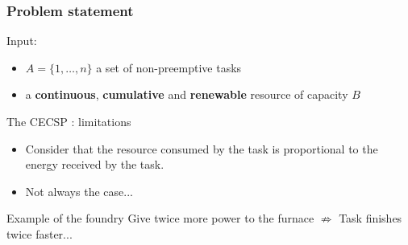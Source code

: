 \begin{frame}
  \frametitle{Problem statement}
  \vfill
  Input:\\
  \begin{itemize}
  \item $A=\{1,\hdots,n\}$ a set of non-preemptive tasks
  \item a {\bf continuous}, {\bf cumulative} and {\bf renewable} resource of capacity  $B$
  \end{itemize}
  \vfill
  \begin{overlayarea}{\linewidth}{1cm}
  \end{overlayarea}
\end{frame}



\begin{frame}{The CECSP : limitations}
  \vfill
  \begin{itemize}
  \item Consider that the resource consumed by the task is proportional to
    the energy received by the task.
    \vfill
    \pause
  \item Not always the case...
  \end{itemize}
  \vfill
  \pause
  \begin{block}{Example of the foundry}
    Give twice more power to the furnace $\not\Rightarrow$ Task
    finishes twice faster... 
  \end{block}
  \vfill

\end{frame}



